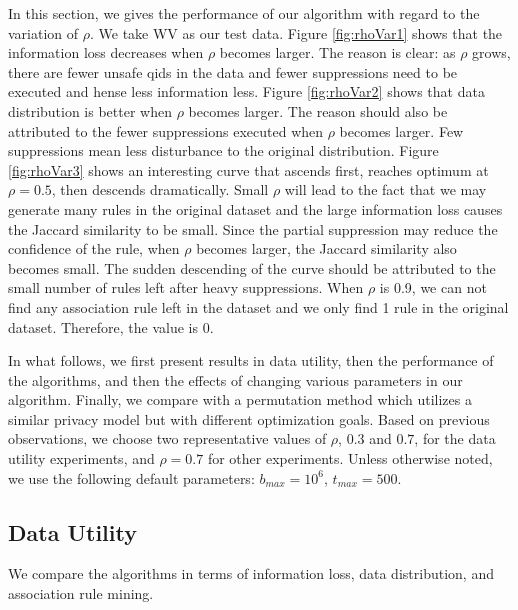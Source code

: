In this section, we gives the performance of our algorithm with regard
to the variation of $\rho$. We take WV as our test data.
Figure \ref{fig:rhoVar1} shows that
the information loss decreases when $\rho$ becomes larger. The reason is
clear: as $\rho$ grows, there are fewer unsafe qids in the data and
fewer suppressions need to be executed and hense less information less.
Figure \ref{fig:rhoVar2} shows that data distribution
is better when $\rho$ becomes larger. The reason should also be attributed to
the fewer suppressions executed when $\rho$ becomes larger. Few suppressions mean
less disturbance to the original distribution.
Figure \ref{fig:rhoVar3} shows an interesting curve that ascends first,
reaches optimum at $\rho=0.5$,
then descends dramatically.
Small $\rho$ will lead to the fact that we may generate many rules in
the original dataset and the large information loss
causes the Jaccard similarity to be small. Since the partial suppression
may reduce the confidence of the rule, when $\rho$ becomes larger,
the Jaccard similarity also becomes small.
The sudden descending of the curve should be attributed to
the small number of rules left after heavy suppressions.
When $\rho$ is 0.9, we can not find any
association rule left in the dataset and we only find 1 rule in the
original dataset. Therefore, the value is 0.

In what follows, we first present results in data utility, then the
performance of the algorithms, and then the effects of
changing various parameters in our algorithm. 
Finally, we compare with a permutation method which utilizes
a similar privacy model but with different optimization goals. 
Based on previous observations, we choose two representative values of $\rho$,
$0.3$ and $0.7$, for the data utility experiments, and $\rho=0.7$ for other experiments.
Unless otherwise noted, we use the following default parameters: 
$b_{max} = 10^6$, $t_{max}=500$. 

\subsection{Data Utility}\label{sec:eval:datautility}
We compare the algorithms in terms of information loss, data distribution,
and association rule mining.

